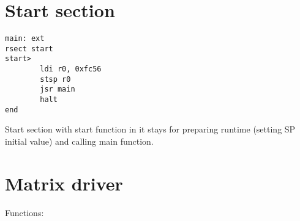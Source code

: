 \section*{Start section}

\begin{lstlisting}
main: ext
rsect start
start>
        ldi r0, 0xfc56
        stsp r0
        jsr main
        halt
end
\end{lstlisting}

Start section with start function in it stays for preparing runtime (setting SP initial value) and calling main function.

\section*{Matrix driver}

Functions:

